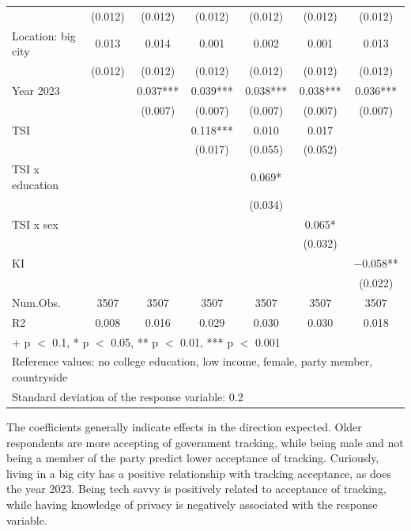 \documentclass[
  letterpaper,
  DIV=11,
  numbers=noendperiod]{scrartcl}
\begin{document}
\begin{table}
{\begin{tabular}[t]{lcccccc}
 & (\num{0.012}) & (\num{0.012}) & (\num{0.012}) & (\num{0.012}) & (\num{0.012}) & \vphantom{1} (\num{0.012})\\
Location: big city & \num{0.013} & \num{0.014} & \num{0.001} & \num{0.002} & \num{0.001} & \num{0.013}\\
 & (\num{0.012}) & (\num{0.012}) & (\num{0.012}) & (\num{0.012}) & (\num{0.012}) & (\num{0.012})\\
Year 2023 &  & \num{0.037}*** & \num{0.039}*** & \num{0.038}*** & \num{0.038}*** & \num{0.036}***\\
 &  & (\num{0.007}) & (\num{0.007}) & (\num{0.007}) & (\num{0.007}) & (\num{0.007})\\
TSI &  &  & \num{0.118}*** & \num{0.010} & \num{0.017} & \\
 &  &  & (\num{0.017}) & (\num{0.055}) & (\num{0.052}) & \\
TSI x education &  &  &  & \num{0.069}* &  & \\
 &  &  &  & (\num{0.034}) &  & \\
TSI x sex &  &  &  &  & \num{0.065}* & \\
 &  &  &  &  & (\num{0.032}) & \\
KI &  &  &  &  &  & \num{-0.058}**\\
 &  &  &  &  &  & (\num{0.022})\\
\midrule
Num.Obs. & \num{3507} & \num{3507} & \num{3507} & \num{3507} & \num{3507} & \num{3507}\\
R2 & \num{0.008} & \num{0.016} & \num{0.029} & \num{0.030} & \num{0.030} & \num{0.018}\\
\bottomrule
\multicolumn{7}{l}{\rule{0pt}{1em}+ p $<$ 0.1, * p $<$ 0.05, ** p $<$ 0.01, *** p $<$ 0.001}\\
\multicolumn{7}{l}{\rule{0pt}{1em}Reference values: no college education, low income, female, party member, countryside}\\
\multicolumn{7}{l}{\rule{0pt}{1em}Standard deviation of the response variable:  0.2}\\
\end{tabular}

}

\end{table}%

The coefficients generally indicate effects in the direction expected.
Older respondents are more accepting of government tracking, while being
male and not being a member of the party predict lower acceptance of
tracking. Curiously, living in a big city has a positive relationship
with tracking acceptance, as does the year 2023. Being tech savvy is
positively related to acceptance of tracking, while having knowledge of
privacy is negatively associated with the response variable.
\end{document}
